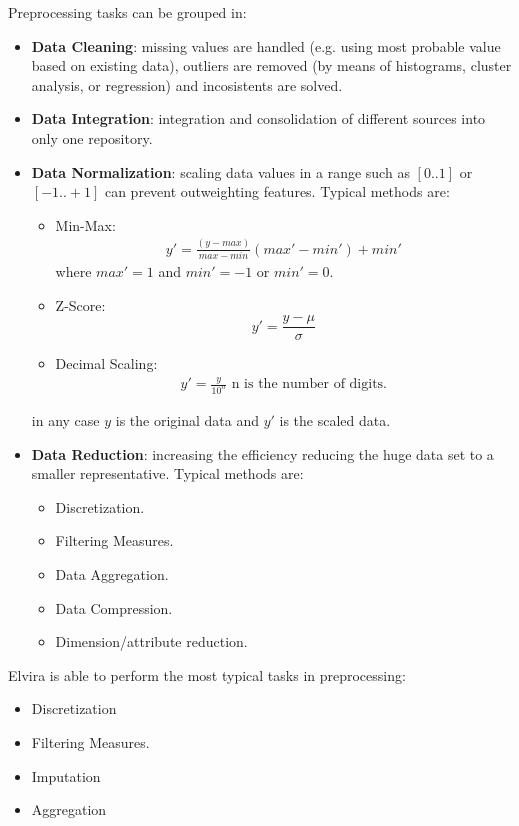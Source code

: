 Preprocessing tasks can be grouped in:
\begin{itemize}
    \item   \textbf{Data Cleaning}: missing values are handled (e.g. using most probable
    		value based on existing data), outliers are removed (by means of histograms,
    		cluster analysis, or regression) and incosistents are solved.
    \item   \textbf{Data Integration}: integration and consolidation of different sources into
    		only one repository.
    \item   \textbf{Data Normalization}: scaling data values in a range such as $[0..1]$ or 
    		$[-1..+1]$ can prevent outweighting features.
    		Typical methods are:
    		\begin{itemize}
    			\item	Min-Max: 
				\begin{eqnarray}
					y'=\frac{(y-max)}{max-min}(max'-min')+min' 
				\end{eqnarray}
				where $max'=1$ and $min'=-1$ or $min'=0$.
    					
    			\item	Z-Score:
				\begin{equation}
					y'=\frac{y-\mu}{\sigma}
				\end{equation}
    			\item	Decimal Scaling: 
				\begin{eqnarray}
					y'=\frac{y}{10^{n}} \text{ n is the number of digits.}
				\end{eqnarray}
    		\end{itemize}
		in any case $y$ is the original data and $y'$ is the scaled data.
    \item   \textbf{Data Reduction}: increasing the efficiency reducing the huge data set to 
    		a smaller representative.
    		Typical methods are:
    		\begin{itemize}
    			\item	Discretization.
    			\item	Filtering Measures.
    			\item	Data Aggregation.
    			\item	Data Compression.
    			\item	Dimension/attribute reduction.
    		\end{itemize}
\end{itemize}

Elvira is able to perform the most typical tasks in preprocessing:
\begin{itemize}
    \item   Discretization
    \item   Filtering Measures.
    \item   Imputation
    \item   Aggregation
\end{itemize}
